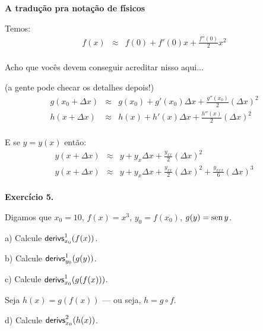 \documentclass[oneside,12pt]{article}
\begin{document}


\newpage

{\bf A tradução pra notação de físicos}

Temos:
%
$$\begin{array}{rcl}
  f(x) &≈& f(0) + f'(0)x + \frac{f''(0)}{2}x^2 \\
  \end{array}
$$

Acho que vocês devem conseguir acreditar nisso aqui...

(a gente pode checar os detalhes depois!)
%
$$\begin{array}{rcl}
  g(x_0 + Δx) &≈& g(x_0) + g'(x_0)Δx + \frac{g''(x_0)}{2}(Δx)^2 \\[2.5pt]
  h(x + Δx) &≈& h(x) + h'(x)Δx + \frac{h''(x)}{2}(Δx)^2 \\
  \end{array}
$$

E se $y=y(x)$ então:
%
$$\begin{array}{rcl}
  y(x+Δx) &≈& y + y_x Δx + \frac{y_{xx}}{2} (Δx)^2 \\[2.5pt]
  y(x+Δx) &≈& y + y_x Δx + \frac{y_{xx}}{2} (Δx)^2 + \frac{y_{xxx}}{6} (Δx)^3 \\
  \end{array}
$$

\newpage


{\bf Exercício 5.}

Digamos que $x_0 = 10$, $f(x)=x^3$, $y_0=f(x_0)$, $g(y)=\operatorname{sen} y$.

\msk

a) Calcule $\mathsf{derivs}_{x_0}^1(f(x))$.

\ssk

b) Calcule $\mathsf{derivs}_{y_0}^1(g(y))$.

\ssk

c) Calcule $\mathsf{derivs}_{x_0}^1(g(f(x)))$.


\bsk

Seja $h(x) = g(f(x))$ --- ou seja, $h = g∘f$.

\msk

d) Calcule $\mathsf{derivs}_{x_0}^2(h(x))$.

\newpage

\end{document}
